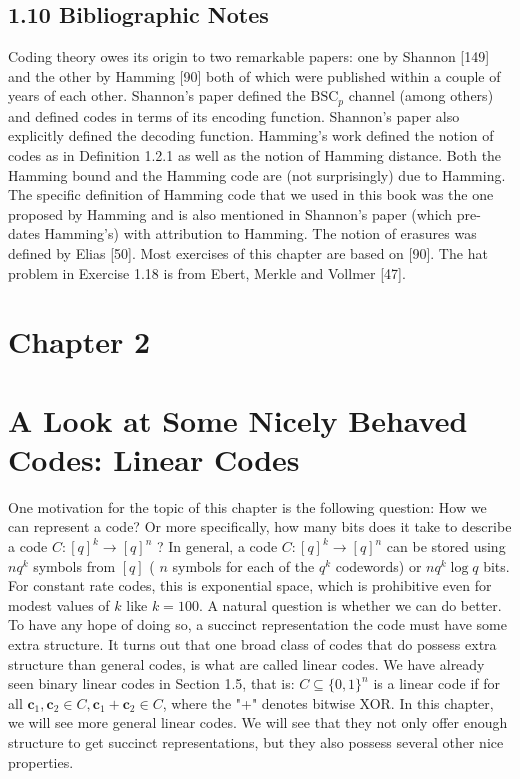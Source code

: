 \documentclass[10pt]{article}
\begin{document}
\subsection*{1.10 Bibliographic Notes}
Coding theory owes its origin to two remarkable papers: one by Shannon [149] and the other by Hamming [90] both of which were published within a couple of years of each other. Shannon's paper defined the $\mathrm{BSC}_{p}$ channel (among others) and defined codes in terms of its encoding function. Shannon's paper also explicitly defined the decoding function. Hamming's work defined the notion of codes as in Definition 1.2.1 as well as the notion of Hamming distance. Both the Hamming bound and the Hamming code are (not surprisingly) due to Hamming. The specific definition of Hamming code that we used in this book was the one proposed by Hamming and is also mentioned in Shannon's paper (which pre-dates Hamming's) with attribution to Hamming. The notion of erasures was defined by Elias [50]. Most exercises of this chapter are based on [90]. The hat problem in Exercise 1.18 is from Ebert, Merkle and Vollmer [47].

\section*{Chapter 2}
\section*{A Look at Some Nicely Behaved Codes: Linear Codes}
One motivation for the topic of this chapter is the following question: How we can represent a code? Or more specifically, how many bits does it take to describe a code $C:[q]^{k} \longrightarrow[q]^{n}$ ? In general, a code $C:[q]^{k} \longrightarrow[q]^{n}$ can be stored using $n q^{k}$ symbols from $[q]$ ( $n$ symbols for each of the $q^{k}$ codewords) or $n q^{k} \log q$ bits. For constant rate codes, this is exponential space, which is prohibitive even for modest values of $k$ like $k=100$. A natural question is whether we can do better. To have any hope of doing so, a succinct representation the code must have some extra structure. It turns out that one broad class of codes that do possess extra structure than general codes, is what are called linear codes. We have already seen binary linear codes in Section 1.5, that is: $C \subseteq\{0,1\}^{n}$ is a linear code if for all $\mathbf{c}_{1}, \mathbf{c}_{2} \in C, \mathbf{c}_{1}+\mathbf{c}_{2} \in C$, where the "+" denotes bitwise XOR. In this chapter, we will see more general linear codes. We will see that they not only offer enough structure to get succinct representations, but they also possess several other nice properties.
\end{document}
